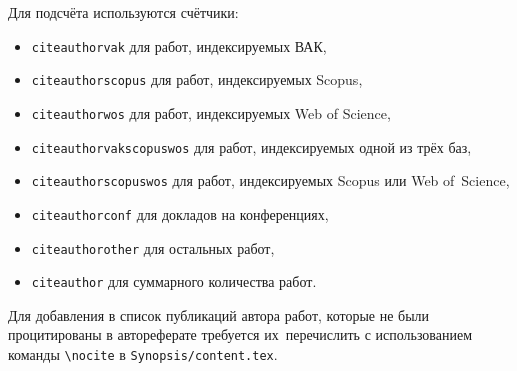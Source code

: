 Для подсчёта используются счётчики:
\begin{itemize}
        \item \texttt{citeauthorvak} для работ, индексируемых ВАК,
        \item \texttt{citeauthorscopus} для работ, индексируемых Scopus,
        \item \texttt{citeauthorwos} для работ, индексируемых Web of Science,
        \item \texttt{citeauthorvakscopuswos} для работ, индексируемых одной из трёх баз,
        \item \texttt{citeauthorscopuswos} для работ, индексируемых Scopus или Web of~Science,
        \item \texttt{citeauthorconf} для докладов на конференциях,
        \item \texttt{citeauthorother} для остальных работ,
        \item \texttt{citeauthor} для суммарного количества работ.
\end{itemize}

Для добавления в список публикаций автора работ, которые не были процитированы в
автореферате требуется их~перечислить с использованием команды \verb!\nocite! в
\verb!Synopsis/content.tex!.
\fi
